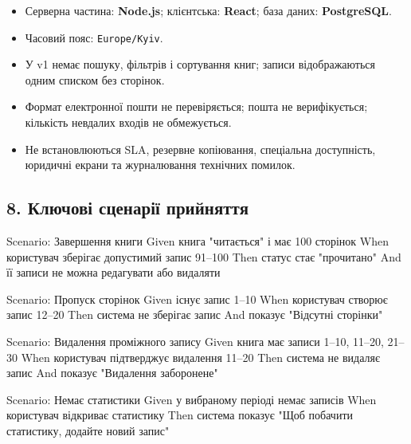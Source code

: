 \documentclass[
]{article}
\newenvironment{Shaded}{}{}
\newcommand{\NormalTok}[1]{#1}
\providecommand{\tightlist}{%
  \setlength{\itemsep}{0pt}\setlength{\parskip}{0pt}}
\begin{document}
\begin{itemize}
\tightlist
\item
  Серверна частина: \textbf{Node.js}; клієнтська: \textbf{React}; база
  даних: \textbf{PostgreSQL}.
\item
  Часовий пояс: \texttt{Europe/Kyiv}.
\item
  У v1 немає пошуку, фільтрів і сортування книг; записи відображаються
  одним списком без сторінок.
\item
  Формат електронної пошти не перевіряється; пошта не верифікується;
  кількість невдалих входів не обмежується.
\item
  Не встановлюються SLA, резервне копіювання, спеціальна доступність,
  юридичні екрани та журналювання технічних помилок.
\end{itemize}

\hypertarget{8-ux43aux43bux44eux447ux43eux432ux456-ux441ux446ux435ux43dux430ux440ux456ux457-ux43fux440ux438ux439ux43dux44fux442ux442ux44f}{%
\subsection{8. Ключові сценарії
прийняття}\label{8-ux43aux43bux44eux447ux43eux432ux456-ux441ux446ux435ux43dux430ux440ux456ux457-ux43fux440ux438ux439ux43dux44fux442ux442ux44f}}

\begin{Shaded}
\begin{Highlighting}[]
\NormalTok{Scenario: Завершення книги}
\NormalTok{  Given книга "читається" і має 100 сторінок}
\NormalTok{  When користувач зберігає допустимий запис 91–100}
\NormalTok{  Then статус стає "прочитано"}
\NormalTok{  And її записи не можна редагувати або видаляти}

\NormalTok{Scenario: Пропуск сторінок}
\NormalTok{  Given існує запис 1–10}
\NormalTok{  When користувач створює запис 12–20}
\NormalTok{  Then система не зберігає запис}
\NormalTok{  And показує "Відсутні сторінки"}

\NormalTok{Scenario: Видалення проміжного запису}
\NormalTok{  Given книга має записи 1–10, 11–20, 21–30}
\NormalTok{  When користувач підтверджує видалення 11–20}
\NormalTok{  Then система не видаляє запис}
\NormalTok{  And показує "Видалення заборонене"}

\NormalTok{Scenario: Немає статистики}
\NormalTok{  Given у вибраному періоді немає записів}
\NormalTok{  When користувач відкриває статистику}
\NormalTok{  Then система показує "Щоб побачити статистику, додайте новий запис"}
\end{Highlighting}
\end{Shaded}
\end{document}
